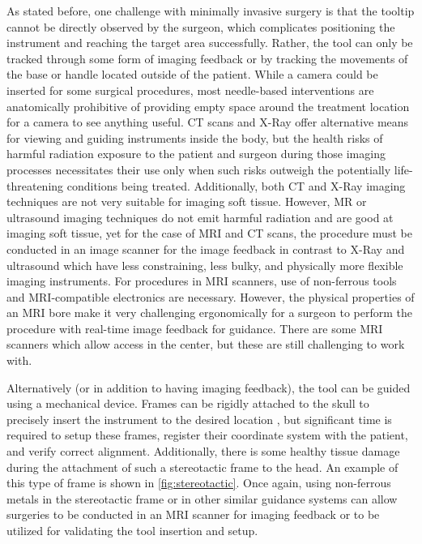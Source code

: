 \documentclass[12pt]{report}
\begin{document}
As stated before, one challenge with minimally invasive surgery is that the tooltip cannot be directly observed by the surgeon, which complicates positioning the instrument and reaching the target area successfully. Rather, the tool can only be tracked through some form of imaging feedback or by tracking the movements of the base or handle located outside of the patient. While a camera could be inserted for some surgical procedures, most needle-based interventions are anatomically prohibitive of providing empty space around the treatment location for a camera to see anything useful. CT scans and X-Ray offer alternative means for viewing and guiding instruments inside the body, but the health risks of harmful radiation exposure to the patient and surgeon during those imaging processes necessitates their use only when such risks outweigh the potentially life-threatening conditions being treated. Additionally, both CT and X-Ray imaging techniques are not very suitable for imaging soft tissue. However, MR or ultrasound imaging techniques do not emit harmful radiation and are good at imaging soft tissue, yet for the case of MRI and CT scans, the procedure must be conducted in an image scanner for the image feedback in contrast to X-Ray and ultrasound which have less constraining, less bulky, and physically more flexible imaging instruments. For procedures in MRI scanners, use of non-ferrous tools and MRI-compatible electronics are necessary. However, the physical properties of an MRI bore make it very challenging ergonomically for a surgeon to perform the procedure with real-time image feedback for guidance. There are some MRI scanners which allow access in the center, but these are still challenging to work with. \cite{openMRI}

Alternatively (or in addition to having imaging feedback), the tool can be guided using a mechanical device. Frames can be rigidly attached to the skull to precisely insert the instrument to the desired location \cite{texasOncology}, but significant time is required to setup these frames, register their coordinate system with the patient, and verify correct alignment. Additionally, there is some healthy tissue damage during the attachment of such a stereotactic frame to the head. An example of this type of frame is shown in \autoref{fig:stereotactic}. Once again, using non-ferrous metals in the stereotactic frame or in other similar guidance systems can allow surgeries to be conducted in an MRI scanner for imaging feedback or to be utilized for validating the tool insertion and setup.
\end{document}
